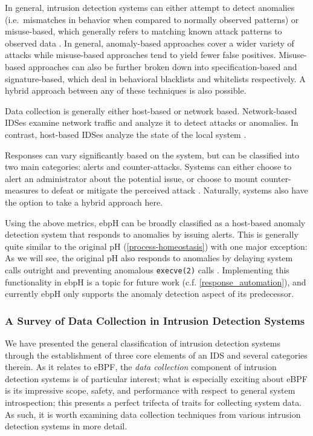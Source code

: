 \documentclass[
  12pt]{findlay}
\newcommand{\passthrough}[1]{#1}
\begin{document}
In general, intrusion detection systems can either attempt to detect
anomalies (i.e.~mismatches in behavior when compared to normally
observed patterns) or misuse-based, which generally refers to matching
known attack patterns to observed data
\autocite{kemmerer02,vanoorschot19}. In general, anomaly-based
approaches cover a wider variety of attacks while misuse-based
approaches tend to yield fewer false positives. Misuse-based approaches
can also be further broken down into specification-based and
signature-based, which deal in behavioral blacklists and whitelists
respectively. A hybrid approach between any of these techniques is also
possible.

Data collection is generally either host-based or network based.
Network-based IDSes examine network traffic and analyze it to detect
attacks or anomalies. In contrast, host-based IDSes analyze the state of
the local system \autocite{kemmerer02,soma02}.

Responses can vary significantly based on the system, but can be
classified into two main categories: alerts and counter-attacks. Systems
can either choose to alert an administrator about the potential issue,
or choose to mount counter-measures to defeat or mitigate the perceived
attack \autocite{kemmerer02}. Naturally, systems also have the option to
take a hybrid approach here.

Using the above metrics, ebpH can be broadly classified as a host-based
anomaly detection system that responds to anomalies by issuing alerts.
This is generally quite similar to the original pH
(\autoref{process-homeostasis}) with one major exception: As we will
see, the original pH also responds to anomalies by delaying system calls
outright and preventing anomalous \passthrough{\lstinline!execve(2)!}
calls \autocite{soma02}. Implementing this functionality in ebpH is a
topic for future work (c.f. \autoref{response_automation}), and
currently ebpH only supports the anomaly detection aspect of its
predecessor.

\hypertarget{a-survey-of-data-collection-in-intrusion-detection-systems}{%
\subsubsection{A Survey of Data Collection in Intrusion Detection
Systems}\label{a-survey-of-data-collection-in-intrusion-detection-systems}}

\label{data_collection_survey}

We have presented the general classification of intrusion detection
systems through the establishment of three core elements of an IDS and
several categories therein. As it relates to eBPF, the \emph{data
collection} component of intrusion detection systems is of particular
interest; what is especially exciting about eBPF is its impressive
scope, safety, and performance with respect to general system
introspection; this presents a perfect trifecta of traits for collecting
system data. As such, it is worth examining data collection techniques
from various intrusion detection systems in more detail.
\end{document}
